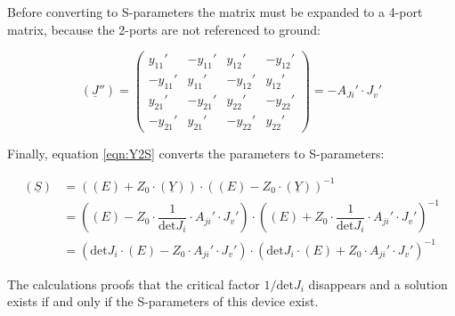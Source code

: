 Before converting to S-parameters the matrix must be expanded to a 4-port
matrix, because the 2-ports are not referenced to ground:

\begin{equation}
(\underline{J}'') =
\begin{pmatrix}
 y_{11}' & -y_{11}' &  y_{12}' & -y_{12}'\\
-y_{11}' &  y_{11}' & -y_{12}' &  y_{12}'\\
 y_{21}' & -y_{21}' &  y_{22}' & -y_{22}'\\
-y_{21}' &  y_{21}' & -y_{22}' &  y_{22}'
\end{pmatrix}
=
-A_{Ji}'\cdot J_v'
\end{equation}

Finally, equation \ref{eqn:Y2S} converts the parameters to S-parameters:

\begin{align}
(\underline{S})
 &= \left( (E) + Z_0\cdot (\underline{Y}) \right) \cdot
    \left( (E) - Z_0\cdot (\underline{Y}) \right)^{-1}\\
 &= \left( (E) - Z_0\cdot \dfrac{1}{\text{det} J_i}\cdot A_{ji}'\cdot J_v' \right) \cdot
    \left( (E) + Z_0\cdot \dfrac{1}{\text{det} J_i}\cdot A_{ji}'\cdot J_v' \right)^{-1}\\
 &= \left( \text{det} J_i\cdot (E) - Z_0\cdot A_{ji}'\cdot J_v' \right) \cdot
    \left( \text{det} J_i\cdot (E) + Z_0\cdot A_{ji}'\cdot J_v' \right)^{-1}
\end{align}

The calculations proofs that the critical factor $1/\text{det} J_i$
disappears and a solution exists if and only if the S-parameters of this
device exist.
